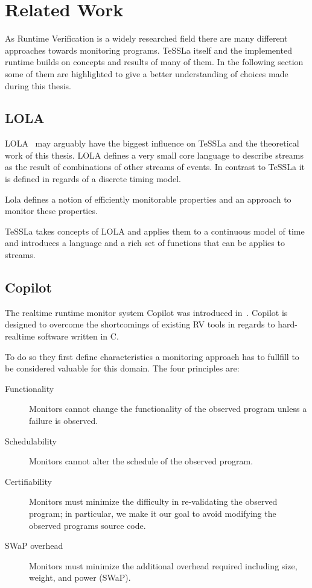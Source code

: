 %
\chapter{Related Work}
\label{sec:related}

As Runtime Verification is a widely researched field there are many different approaches towards monitoring programs.
TeSSLa itself and the implemented runtime builds on concepts and results of many of them.
In the following section some of them are highlighted to give a better understanding of choices made during this thesis.

\section{LOLA}
\label{sec:related:lola}

LOLA~\cite{DAngelo2005} may arguably have the biggest influence on TeSSLa and the theoretical work of this thesis.
LOLA defines a very small core language to describe streams as the result of combinations of other streams of events.
In contrast to TeSSLa it is defined in regards of a discrete timing model.

Lola defines a notion of efficiently monitorable properties and an approach to monitor these properties.

TeSSLa takes concepts of LOLA and applies them to a continuous model of time and introduces a language and a rich
set of functions that can be applies to streams.

\section{Copilot}
\label{sec:related:copilot}

The realtime runtime monitor system Copilot was introduced in~\cite{Pike2010}.
Copilot is designed to overcome the shortcomings of existing RV tools in regards to hard-realtime software written in C.

To do so they first define characteristics a monitoring approach has to fullfill to be considered valuable for this domain.
The four principles are:

\begin{description}
  \item[Functionality] Monitors cannot change the functionality of the observed program unless a failure is observed.
  \item[Schedulability] Monitors cannot alter the schedule of the observed program.
  \item[Certifiability] Monitors must minimize the difficulty in re-validating the observed program; in particular, we make it our goal to avoid modifying the observed programs source code.
  \item[SWaP overhead] Monitors must minimize the additional overhead required including size, weight, and power (SWaP).
\end{description}

